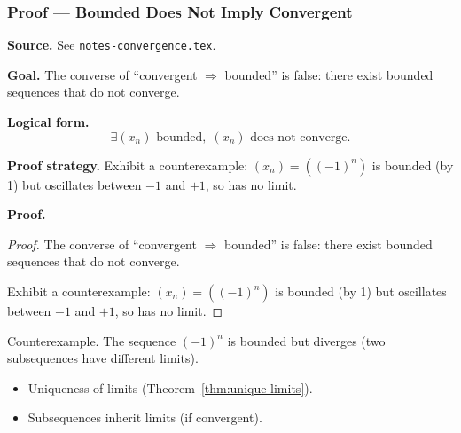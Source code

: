 
\clearpage
{}
\hypertarget{proof-RA-ABB-P-bounded-not-conv}{}

\subsubsection[Bounded Does Not Imply Convergent]{Proof --- Bounded Does Not Imply Convergent}

\bigskip

\noindent
\textbf{Source.}
See \texttt{notes-convergence.tex}.

\vspace{0.75em}

\noindent
\textbf{Goal.}
The converse of ``convergent $\Rightarrow$ bounded'' is false: there exist bounded sequences that do not converge.

\vspace{0.75em}

\noindent
\textbf{Logical form.}
\[
  \exists (x_n) \text{ bounded},\; (x_n) \text{ does not converge}.
\]

\vspace{0.75em}

\noindent
\textbf{Proof strategy.}
Exhibit a counterexample: $(x_n) = ((-1)^n)$ is bounded (by 1) but oscillates between $-1$ and $+1$, so has no limit.

\vspace{0.75em}

\noindent
\textbf{Proof.}
\begin{proof}
\Claim The converse of ``convergent $\Rightarrow$ bounded'' is false: there exist bounded sequences that do not converge.

\Given 

\Goal 

\Strategy Exhibit a counterexample: $(x_n) = ((-1)^n)$ is bounded (by 1) but oscillates between $-1$ and $+1$, so has no limit.

\medskip


\end{proof}

\begin{remark*}
Counterexample. The sequence $(-1)^n$ is bounded but diverges (two subsequences have different limits).
\end{remark*}

\begin{remark*}[Dependencies]
\begin{itemize}
  \item Uniqueness of limits (Theorem~\ref{thm:unique-limits}).
  \item Subsequences inherit limits (if convergent).
\end{itemize}
\end{remark*}
